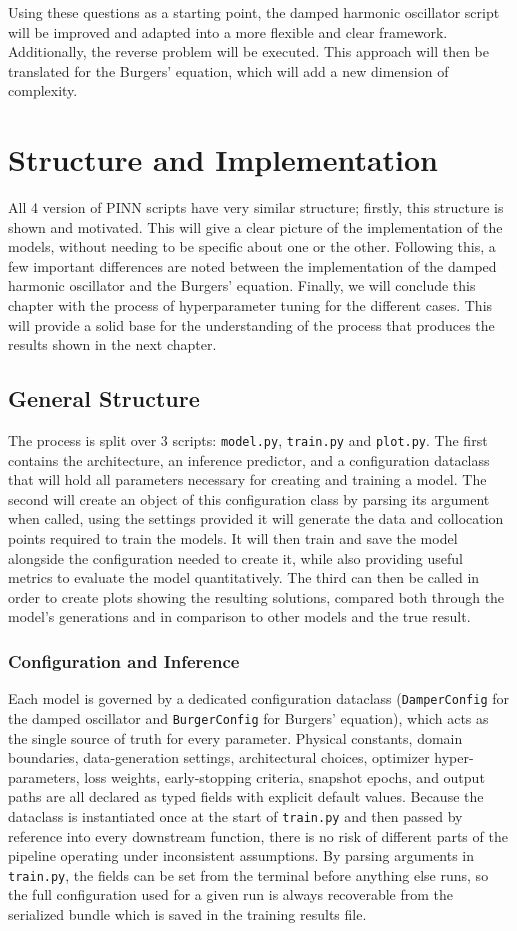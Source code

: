 \documentclass[12pt, a4paper]{report}
\begin{document}
Using these questions as a starting point, the damped harmonic oscillator script will be improved and adapted into a more flexible and clear framework. Additionally, the reverse problem will be executed. This approach will then be translated for the Burgers' equation, which will add a new dimension of complexity.

\chapter{Structure and Implementation}
All 4 version of PINN scripts have very similar structure; firstly, this structure is shown and motivated. This will give a clear picture of the implementation of the models, without needing to be specific about one or the other. Following this, a few important differences are noted between the implementation of the damped harmonic oscillator and the Burgers' equation. Finally, we will conclude this chapter with the process of hyperparameter tuning for the different cases. This will provide a solid base for the understanding of the process that produces the results shown in the next chapter.
\section{General Structure}
The process is split over 3 scripts: \verb|model.py|, \verb|train.py| and \verb|plot.py|. The first contains the architecture, an inference predictor, and a configuration dataclass that will hold all parameters necessary for creating and training a model. The second will create an object of this configuration class by parsing its argument when called, using the settings provided it will generate the data and collocation points required to train the models. It will then train and save the model alongside the configuration needed to create it, while also providing useful metrics to evaluate the model quantitatively. The third can then be called in order to create plots showing the resulting solutions, compared both through the model's generations and in comparison to other models and the true result.
\subsection{Configuration and Inference}
Each model is governed by a dedicated configuration dataclass (\verb|DamperConfig| for the damped oscillator and \verb|BurgerConfig| for Burgers' equation), which acts as the single source of truth for every parameter. Physical constants, domain boundaries, data-generation settings, architectural choices, optimizer hyper-parameters, loss weights, early-stopping criteria, snapshot epochs, and output paths are all declared as typed fields with explicit default values. Because the dataclass is instantiated once at the start of \verb|train.py| and then passed by reference into every downstream function, there is no risk of different parts of the pipeline operating under inconsistent assumptions. By parsing arguments in \verb|train.py|, the fields can be set from the terminal before anything else runs, so the full configuration used for a given run is always recoverable from the serialized bundle which is saved in the training results file.
\end{document}
